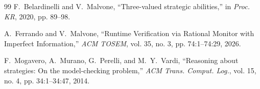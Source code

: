 \documentclass[11pt,twocolumn]{article}
\begin{document}
\begin{thebibliography}{99}
F.~Belardinelli and V.~Malvone, ``Three-valued strategic abilities,'' in \textit{Proc. KR}, 2020, pp. 89--98.

A.~Ferrando and V.~Malvone, ``Runtime Verification via Rational Monitor with Imperfect Information,'' \textit{ACM TOSEM}, vol. 35, no. 3, pp. 74:1--74:29, 2026.

F.~Mogavero, A.~Murano, G.~Perelli, and M.~Y.~Vardi, ``Reasoning about strategies: On the model-checking problem,'' \textit{ACM Trans. Comput. Log.}, vol. 15, no. 4, pp. 34:1--34:47, 2014.

\end{thebibliography}
\end{document}
